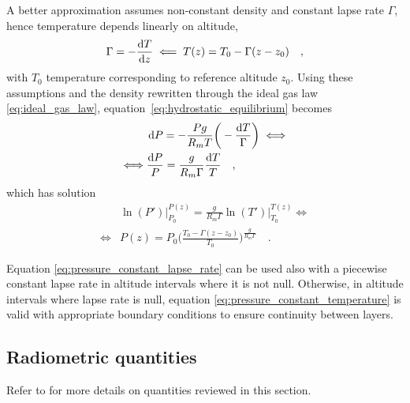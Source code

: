 \documentclass[a4paper,10pt,twocolumn,\classoptions]{article}
\begin{document}
A better approximation assumes non-constant density and constant lapse rate $\Gamma$, hence temperature depends linearly on altitude,
\begin{equation}
  \label{eq:constant_lapse_rate}
  \Gamma = - \frac{\odif{T}}{\odif{z}} \impliedby T(z) = T_0 - \Gamma (z - z_0)
  \quad ,
\end{equation}
with $T_0$ temperature corresponding to reference altitude $z_0$. Using these assumptions and the density rewritten through the ideal gas law \eqref{eq:ideal_gas_law}, equation~\eqref{eq:hydrostatic_equilibrium} becomes
\begin{equation}
  \label{eq:hydrostatic_equilibrium_ideal_gas_law_constant_lapse_rate}
  \begin{split}
    & \odif{P} = - \frac{P g}{R_m T} \bigg( - \frac{\odif{T}}{\Gamma} \bigg) \iff \\
    \iff & \frac{\odif{P}}{P} = \frac{g}{R_m \Gamma} \frac{\odif{T}}{T}
    \quad ,
  \end{split}
\end{equation}
which has solution
\begin{equation}
  \label{eq:pressure_constant_lapse_rate}
  \begin{split}
    & \ln(P') \bigg|_{P_0}^{P(z)} = \frac{g}{R_m \Gamma} \ln(T') \bigg|_{T_0}^{T(z)} \iff \\
    \iff & P(z) = P_0 \bigg( \frac{T_0 - \Gamma (z - z_0)}{T_0} \bigg)^\frac{g}{R_m \Gamma}
    \quad .
  \end{split}
\end{equation}

Equation \eqref{eq:pressure_constant_lapse_rate} can be used also with a piecewise constant lapse rate in altitude intervals where it is not null. Otherwise, in altitude intervals where lapse rate is null, equation \eqref{eq:pressure_constant_temperature} is valid with appropriate boundary conditions to ensure continuity between layers.



\subsection{Radiometric quantities}
\label{sec:Radiometric quantities}
Refer to \cite{CIE} for more details on quantities reviewed in this section.
\end{document}

